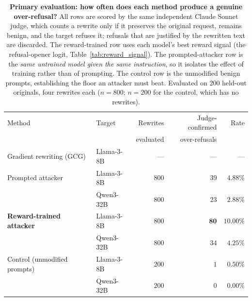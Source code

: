 \documentclass{article}
\begin{document}
\begin{table}[t]
  \centering
  \small
  \caption{\textbf{Primary evaluation: how often does each method produce a genuine
  over-refusal?} All rows are scored by the same independent Claude Sonnet judge, which counts
  a rewrite only if it preserves the original request, remains benign, and the target refuses
  it; refusals that are justified by the rewritten text are discarded. The reward-trained row
  uses each model's best reward signal (the refusal-opener logit, Table~\ref{tab:reward_signal}).
  The prompted-attacker row is the \emph{same untrained model given the same instruction}, so it
  isolates the effect of training rather than of prompting. The control row is the unmodified
  benign prompts, establishing the floor an attacker must beat. Evaluated on 200 held-out
  originals, four rewrites each ($n=800$; $n=200$ for the control, which has no rewrites).}
  \label{tab:primary}
  \begin{tabular}{@{}llrrr@{}}
    \toprule
    Method & Target & Rewrites & Judge-confirmed & Rate \\
    & & evaluated & over-refusals & \\
    \midrule
    Gradient rewriting (GCG) & Llama-3-8B & --- & --- & --- \\
    \addlinespace[2pt]
    Prompted attacker & Llama-3-8B & $800$ & $39$ & $4.88\%$ \\
                      & Qwen3-32B  & $800$ & $23$ & $2.88\%$ \\
    \addlinespace[2pt]
    \textbf{Reward-trained attacker} & Llama-3-8B & $800$ & $\mathbf{80}$ & $\mathbf{10.00\%}$ \\
                                     & Qwen3-32B  & $800$ & $34$ & $4.25\%$ \\
    \addlinespace[2pt]
    Control (unmodified prompts) & Llama-3-8B & $200$ & $1$ & $0.50\%$ \\
                                 & Qwen3-32B  & $200$ & $0$ & $0.00\%$ \\
    \bottomrule
  \end{tabular}
\end{table}
\end{document}
